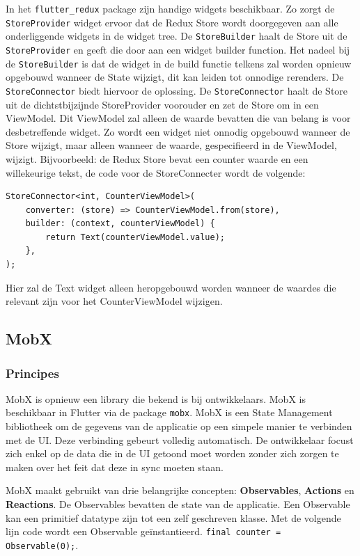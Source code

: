 In het \verb|flutter_redux| package zijn handige widgets beschikbaar. Zo zorgt de \verb|StoreProvider| widget ervoor dat de Redux Store wordt doorgegeven aan alle onderliggende widgets in de widget tree. De \verb|StoreBuilder| haalt de Store uit de \verb|StoreProvider| en geeft die door aan een widget builder function. Het nadeel bij de \verb|StoreBuilder| is dat de widget in de build functie telkens zal worden opnieuw opgebouwd wanneer de State wijzigt, dit kan leiden tot onnodige rerenders. De \verb|StoreConnector| biedt hiervoor de oplossing. De \verb|StoreConnector| haalt de Store uit de dichtstbijzijnde StoreProvider voorouder en zet de Store om in een ViewModel. Dit ViewModel zal alleen de waarde bevatten die van belang is voor desbetreffende widget. Zo wordt een widget niet onnodig opgebouwd wanneer de Store wijzigt, maar alleen wanneer de waarde, gespecifieerd in de ViewModel, wijzigt. Bijvoorbeeld: de Redux Store bevat een counter waarde en een willekeurige tekst, de code voor de StoreConnecter wordt de volgende: 

\begin{verbatim}
StoreConnector<int, CounterViewModel>(
    converter: (store) => CounterViewModel.from(store),
    builder: (context, counterViewModel) {
        return Text(counterViewModel.value);
    },
);
\end{verbatim}
Hier zal de Text widget alleen heropgebouwd worden wanneer de waardes die relevant zijn voor het CounterViewModel wijzigen.


\subsection{MobX}
\label{ch:mobx}
\subsubsection{Principes}
MobX is opnieuw een library die bekend is bij ontwikkelaars. MobX is beschikbaar in Flutter via de package \verb|mobx|. MobX is een State Management bibliotheek om de gegevens van de applicatie op een simpele manier te verbinden met de UI. Deze verbinding gebeurt volledig automatisch. De ontwikkelaar focust zich enkel op de data die in de UI getoond moet worden zonder zich zorgen te maken over het feit dat deze in sync moeten staan.

MobX maakt gebruikt van drie belangrijke concepten: \textbf{Observables}, \textbf{Actions} en \textbf{Reactions}.
\newline
De Observables bevatten de state van de applicatie. Een Observable kan een primitief datatype zijn tot een zelf geschreven klasse. Met de volgende lijn code wordt een Observable geïnstantieerd. \verb|final counter = Observable(0);|.

